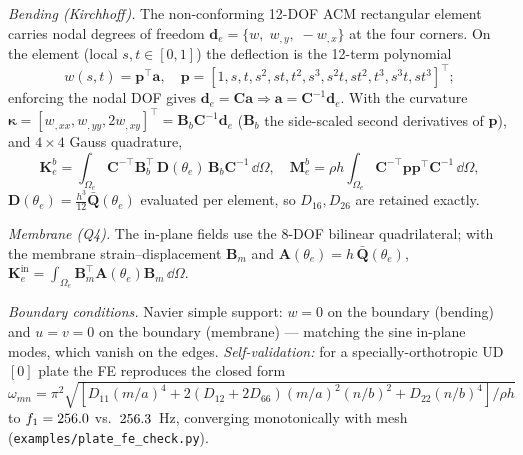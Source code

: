 \emph{Bending (Kirchhoff).} The non-conforming 12-DOF ACM rectangular element carries
nodal degrees of freedom $\bm d_e=\{w,\;w_{,y},\;-w_{,x}\}$ at the four corners. On the
element (local $s,t\in[0,1]$) the deflection is the 12-term polynomial
\begin{equation}
w(s,t)=\bm p^{\!\top}\bm a,\quad
\bm p=[1,s,t,s^2,st,t^2,s^3,s^2t,st^2,t^3,s^3t,st^3]^{\!\top};
\end{equation}
enforcing the nodal DOF gives $\bm d_e=\bm C\bm a\Rightarrow\bm a=\bm C^{-1}\bm d_e$. With
the curvature $\bm\kappa=[w_{,xx},w_{,yy},2w_{,xy}]^{\!\top}=\bm B_b\bm C^{-1}\bm d_e$
($\bm B_b$ the side-scaled second derivatives of $\bm p$), and $4\times4$ Gauss quadrature,
\begin{equation}
\bm K^b_e=\!\int_{\Omega_e}\!\bm C^{-\top}\bm B_b^{\!\top}\,\bm D(\theta_e)\,\bm B_b\bm C^{-1}\,\dd\Omega,
\quad
\bm M^b_e=\rho h\!\int_{\Omega_e}\!\bm C^{-\top}\bm p\bm p^{\!\top}\bm C^{-1}\,\dd\Omega,
\end{equation}
$\bm D(\theta_e)=\tfrac{h^3}{12}\bar{\bm Q}(\theta_e)$ evaluated per element, so
$D_{16},D_{26}$ are retained exactly.

\emph{Membrane (Q4).} The in-plane fields use the 8-DOF bilinear quadrilateral; with the
membrane strain--displacement $\bm B_m$ and $\bm A(\theta_e)=h\,\bar{\bm Q}(\theta_e)$,
$\bm K^{\mathrm{in}}_e=\int_{\Omega_e}\bm B_m^{\!\top}\bm A(\theta_e)\bm B_m\,\dd\Omega$.

\emph{Boundary conditions.} Navier simple support: $w=0$ on the boundary (bending) and
$u=v=0$ on the boundary (membrane) --- matching the sine in-plane modes, which vanish on
the edges. \emph{Self-validation:} for a specially-orthotropic UD $[0]$ plate the FE
reproduces the closed form
$\omega_{mn}=\pi^2\sqrt{[D_{11}(m/a)^4+2(D_{12}{+}2D_{66})(m/a)^2(n/b)^2+D_{22}(n/b)^4]/\rho h}$
to $f_1=256.0$ vs.\ $256.3$~Hz, converging monotonically with mesh
(\texttt{examples/plate\_fe\_check.py}).

